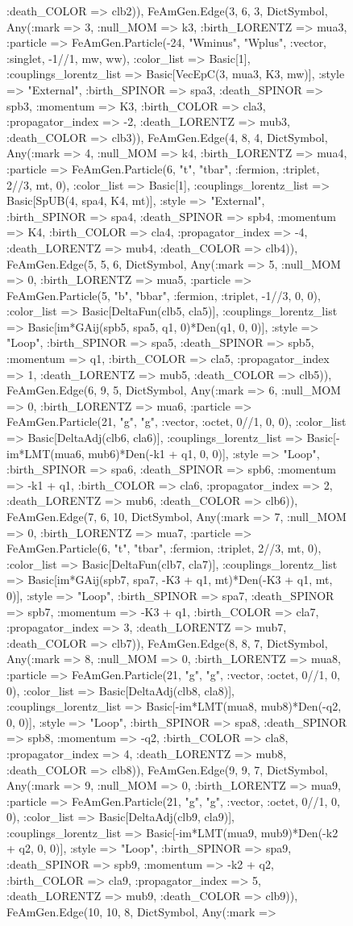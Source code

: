 \documentclass{revtex4}
\begin{document}
\begin{figure}[!htb]
\begin{center}
{:death_COLOR => clb2)), FeAmGen.Edge(3, 6, 3, Dict{Symbol, Any}(:mark => 3, :null_MOM => k3, :birth_LORENTZ => mua3, :particle => FeAmGen.Particle(-24, "Wminus", "Wplus", :vector, :singlet, -1//1, mw, ww), :color_list => Basic[1], :couplings_lorentz_list => Basic[VecEpC(3, mua3, K3, mw)], :style => "External", :birth_SPINOR => spa3, :death_SPINOR => spb3, :momentum => K3, :birth_COLOR => cla3, :propagator_index => -2, :death_LORENTZ => mub3, :death_COLOR => clb3)), FeAmGen.Edge(4, 8, 4, Dict{Symbol, Any}(:mark => 4, :null_MOM => k4, :birth_LORENTZ => mua4, :particle => FeAmGen.Particle(6, "t", "tbar", :fermion, :triplet, 2//3, mt, 0), :color_list => Basic[1], :couplings_lorentz_list => Basic[SpUB(4, spa4, K4, mt)], :style => "External", :birth_SPINOR => spa4, :death_SPINOR => spb4, :momentum => K4, :birth_COLOR => cla4, :propagator_index => -4, :death_LORENTZ => mub4, :death_COLOR => clb4)), FeAmGen.Edge(5, 5, 6, Dict{Symbol, Any}(:mark => 5, :null_MOM => 0, :birth_LORENTZ => mua5, :particle => FeAmGen.Particle(5, "b", "bbar", :fermion, :triplet, -1//3, 0, 0), :color_list => Basic[DeltaFun(clb5, cla5)], :couplings_lorentz_list => Basic[im*GAij(spb5, spa5, q1, 0)*Den(q1, 0, 0)], :style => "Loop", :birth_SPINOR => spa5, :death_SPINOR => spb5, :momentum => q1, :birth_COLOR => cla5, :propagator_index => 1, :death_LORENTZ => mub5, :death_COLOR => clb5)), FeAmGen.Edge(6, 9, 5, Dict{Symbol, Any}(:mark => 6, :null_MOM => 0, :birth_LORENTZ => mua6, :particle => FeAmGen.Particle(21, "g", "g", :vector, :octet, 0//1, 0, 0), :color_list => Basic[DeltaAdj(clb6, cla6)], :couplings_lorentz_list => Basic[-im*LMT(mua6, mub6)*Den(-k1 + q1, 0, 0)], :style => "Loop", :birth_SPINOR => spa6, :death_SPINOR => spb6, :momentum => -k1 + q1, :birth_COLOR => cla6, :propagator_index => 2, :death_LORENTZ => mub6, :death_COLOR => clb6)), FeAmGen.Edge(7, 6, 10, Dict{Symbol, Any}(:mark => 7, :null_MOM => 0, :birth_LORENTZ => mua7, :particle => FeAmGen.Particle(6, "t", "tbar", :fermion, :triplet, 2//3, mt, 0), :color_list => Basic[DeltaFun(clb7, cla7)], :couplings_lorentz_list => Basic[im*GAij(spb7, spa7, -K3 + q1, mt)*Den(-K3 + q1, mt, 0)], :style => "Loop", :birth_SPINOR => spa7, :death_SPINOR => spb7, :momentum => -K3 + q1, :birth_COLOR => cla7, :propagator_index => 3, :death_LORENTZ => mub7, :death_COLOR => clb7)), FeAmGen.Edge(8, 8, 7, Dict{Symbol, Any}(:mark => 8, :null_MOM => 0, :birth_LORENTZ => mua8, :particle => FeAmGen.Particle(21, "g", "g", :vector, :octet, 0//1, 0, 0), :color_list => Basic[DeltaAdj(clb8, cla8)], :couplings_lorentz_list => Basic[-im*LMT(mua8, mub8)*Den(-q2, 0, 0)], :style => "Loop", :birth_SPINOR => spa8, :death_SPINOR => spb8, :momentum => -q2, :birth_COLOR => cla8, :propagator_index => 4, :death_LORENTZ => mub8, :death_COLOR => clb8)), FeAmGen.Edge(9, 9, 7, Dict{Symbol, Any}(:mark => 9, :null_MOM => 0, :birth_LORENTZ => mua9, :particle => FeAmGen.Particle(21, "g", "g", :vector, :octet, 0//1, 0, 0), :color_list => Basic[DeltaAdj(clb9, cla9)], :couplings_lorentz_list => Basic[-im*LMT(mua9, mub9)*Den(-k2 + q2, 0, 0)], :style => "Loop", :birth_SPINOR => spa9, :death_SPINOR => spb9, :momentum => -k2 + q2, :birth_COLOR => cla9, :propagator_index => 5, :death_LORENTZ => mub9, :death_COLOR => clb9)), FeAmGen.Edge(10, 10, 8, Dict{Symbol, Any}(:mark => }
\end{center}
\end{figure}
\end{document}
